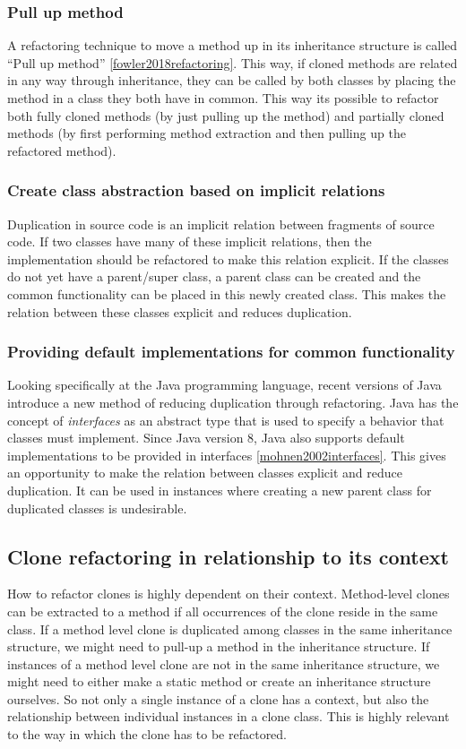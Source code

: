 \subsubsection{Pull up method}
A refactoring technique to move a method up in its inheritance structure is called ``Pull up method'' \ref{fowler2018refactoring}. This way, if cloned methods are related in any way through inheritance, they can be called by both classes by placing the method in a class they both have in common. This way its possible to refactor both fully cloned methods (by just pulling up the method) and partially cloned methods (by first performing method extraction and then pulling up the refactored method).

\subsubsection{Create class abstraction based on implicit relations}
Duplication in source code is an implicit relation between fragments of source code. If two classes have many of these implicit relations, then the implementation should be refactored to make this relation explicit. If the classes do not yet have a parent/super class, a parent class can be created and the common functionality can be placed in this newly created class. This makes the relation between these classes explicit and reduces duplication.

\subsubsection{Providing default implementations for common functionality}
Looking specifically at the Java programming language, recent versions of Java introduce a new method of reducing duplication through refactoring. Java has the concept of \textit{interfaces} as an abstract type that is used to specify a behavior that classes must implement. Since Java version 8, Java also supports default implementations to be provided in interfaces \ref{mohnen2002interfaces}. This gives an opportunity to make the relation between classes explicit and reduce duplication. It can be used in instances where creating a new parent class for duplicated classes is undesirable.

\subsection{Clone refactoring in relationship to its context}
How to refactor clones is highly dependent on their context. Method-level clones can be extracted to a method \cite{kodhai2013method} if all occurrences of the clone reside in the same class. If a method level clone is duplicated among classes in the same inheritance structure, we might need to pull-up a method in the inheritance structure. If instances of a method level clone are not in the same inheritance structure, we might need to either make a static method or create an inheritance structure ourselves. So not only a single instance of a clone has a context, but also the relationship between individual instances in a clone class. This is highly relevant to the way in which the clone has to be refactored.

